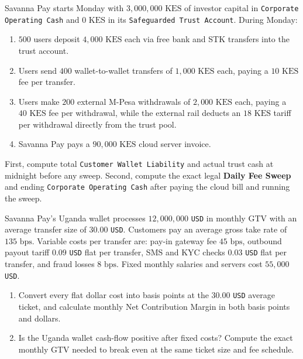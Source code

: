 \begin{exercise}
Savanna Pay starts Monday with $3{,}000{,}000\text{ KES}$ of investor capital in \texttt{Corporate Operating Cash} and $0\text{ KES}$ in its \texttt{Safeguarded Trust Account}. During Monday:
\begin{enumerate}
  \item $500$ users deposit $4{,}000\text{ KES}$ each via free bank and STK transfers into the trust account.
  \item Users send $400$ wallet-to-wallet transfers of $1{,}000\text{ KES}$ each, paying a $10\text{ KES}$ fee per transfer.
  \item Users make $200$ external M-Pesa withdrawals of $2{,}000\text{ KES}$ each, paying a $40\text{ KES}$ fee per withdrawal, while the external rail deducts an $18\text{ KES}$ tariff per withdrawal directly from the trust pool.
  \item Savanna Pay pays a $90{,}000\text{ KES}$ cloud server invoice.
\end{enumerate}
First, compute total \texttt{Customer Wallet Liability} and actual trust cash at midnight before any sweep. Second, compute the exact legal \textbf{Daily Fee Sweep} and ending \texttt{Corporate Operating Cash} after paying the cloud bill and running the sweep.
\end{exercise}

\begin{exercise}
Savanna Pay's Uganda wallet processes $12{,}000{,}000$ \texttt{USD} in monthly GTV with an average transfer size of $30.00$ \texttt{USD}. Customers pay an average gross take rate of $135\text{ bps}$. Variable costs per transfer are: pay-in gateway fee $45\text{ bps}$, outbound payout tariff $0.09$ \texttt{USD} flat per transfer, SMS and KYC checks $0.03$ \texttt{USD} flat per transfer, and fraud losses $8\text{ bps}$. Fixed monthly salaries and servers cost $55{,}000$ \texttt{USD}.
\begin{enumerate}
  \item Convert every flat dollar cost into basis points at the $30.00$ \texttt{USD} average ticket, and calculate monthly Net Contribution Margin in both basis points and dollars.
  \item Is the Uganda wallet cash-flow positive after fixed costs? Compute the exact monthly GTV needed to break even at the same ticket size and fee schedule.
\end{enumerate}
\end{exercise}

